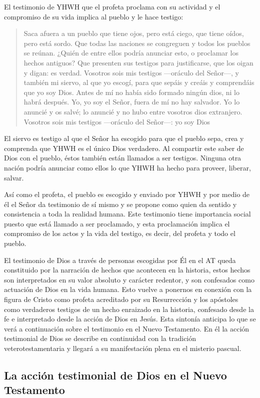 El testimonio de YHWH que el profeta proclama con su actividad y el compromiso de su vida implica al pueblo y le hace testigo: \blockquote[][\,(Is 43,8-12)]{Saca afuera a un pueblo que tiene ojos, pero está ciego, que tiene oídos, pero está sordo. Que todas las naciones se congreguen y todos los pueblos se reúnan. ¿Quién de entre ellos podría anunciar esto, o proclamar los hechos antiguos? Que presenten sus testigos para justificarse, que los oigan y digan: es verdad. Vosotros sois mis testigos ---oráculo del Señor---, y también mi siervo, al que yo escogí, para que sepáis y creáis y comprendáis que yo soy Dios. Antes de mí no había sido formado ningún dios, ni lo habrá después. Yo, yo soy el Señor, fuera de mí no hay salvador. Yo lo anuncié y os salvé; lo anuncié y no hubo entre vosotros dios extranjero. Vosotros sois mis testigos ---oráculo del Señor---: yo soy Dios}. El siervo es testigo al que el Señor ha escogido para que el pueblo sepa, crea y comprenda que YHWH es el único Dios verdadero. Al compartir este saber de Dios con el pueblo, éstos también están llamados a ser testigos. Ninguna otra nación podría anunciar como ellos lo que YHWH ha hecho para proveer, liberar, salvar.

Así como el profeta, el pueblo es escogido y enviado por YHWH y por medio de él el Señor da testimonio de sí mismo y se propone como quien da sentido y consistencia a toda la realidad humana. Este testimonio tiene importancia social puesto que está llamado a ser proclamado, y esta proclamación implica el compromiso de los actos y la vida del testigo, es decir, del profeta y todo el pueblo\autocite[Cf.][1526-1527]{latourelle2000testimonio}.

El testimonio de Dios a través de personas escogidas por Él en el AT queda constituido por la narración de hechos que acontecen en la historia, estos hechos son interpretados en su valor absoluto y carácter redentor, y son confesados como actuación de Dios en la vida humana\autocite[Cf.][119]{prades2015testimonio}. Esto vuelve a ponernos en conexión con la figura de Cristo como profeta acreditado por su Resurrección y los apóstoles como verdaderos testigos de un hecho enraizado en la historia, confesado desde la fe e interpretado desde la acción de Dios en Jesús. Esta sintonía anticipa lo que se verá a continuación sobre el testimonio en el Nuevo Testamento. En él la acción testimonial de Dios se describe en continuidad con la tradición veterotestamentaria y llegará a su manifestación plena en el misterio pascual.

\subsection{La acción testimonial de Dios en el Nuevo Testamento}

